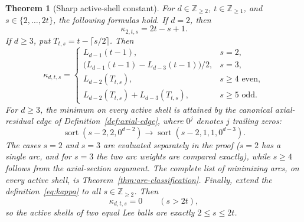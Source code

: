 \documentclass[pdflatex,sn-mathphys-num]{sn-jnl}
\theoremstyle{thmstyleone}
\newtheorem{theorem}{Theorem}[section]
\theoremstyle{thmstylethree}
\theoremstyle{thmstyletwo}
\newcommand{\Z}{\mathbb Z}
\begin{document}
\begin{theorem}[Sharp active-shell constant]
\label{thm:sharp-kappa}
For $d\in\Z_{\ge2}$, $t\in\Z_{\ge1}$, and
$s\in\{2,\ldots,2t\}$, the following formulas hold.  If $d=2$, then
\begin{equation}
 \kappa_{2,t,s}=2t-s+1.                              \label{eq:kappa-d2}
\end{equation}
If $d\ge3$, put
$T_{t,s}=t-\lceil s/2\rceil$.  Then
\begin{equation}
\kappa_{d,t,s}=
\begin{cases}
L_{d-1}(t-1),&s=2,\\[2pt]
\bigl(L_{d-1}(t-1)-L_{d-3}(t-1)\bigr)/2,&s=3,\\[2pt]
L_{d-2}(T_{t,s}),&s\ge4\text{ even},\\[2pt]
L_{d-2}(T_{t,s})+L_{d-3}(T_{t,s}),
   &s\ge5\text{ odd}.
\end{cases}                                           \label{eq:kappa-closed}
\end{equation}
For $d\ge3$, the minimum on every active shell is attained by the canonical
axial-residual edge of Definition~\ref{def:axial-edge}, where $0^j$ denotes
$j$ trailing zeros:
\begin{equation}
 \operatorname{sort}(s-2,2,0^{d-2})
 \longrightarrow
 \operatorname{sort}(s-2,1,1,0^{d-3}).                \label{eq:axial-minimizer}
\end{equation}
The cases $s=2$ and $s=3$ are evaluated separately in the proof ($s=2$ has a
single arc, and for $s=3$ the two arc weights are compared exactly), while
$s\ge4$ follows from the axial-section argument.  The complete list of
minimizing arcs, on every active shell, is
Theorem~\ref{thm:arc-classification}.
Finally, extend the definition~\eqref{eq:kappa} to all $s\in\Z_{\ge2}$.  Then
\begin{equation}
 \kappa_{d,t,s}=0\qquad(s>2t),                        \label{eq:kappa-inactive}
\end{equation}
so the active shells of two equal Lee balls are exactly $2\le s\le2t$.
\end{theorem}
\end{document}
